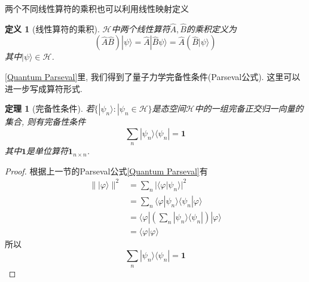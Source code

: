 \documentclass[a4paper,11pt]{book}
\newtheorem{definition}{\hspace{2em}定义}[section]
\newtheorem{theorem}{\hspace{2em}定理}[section]
\newtheorem{proof}{证明}[section]
\begin{document}
两个不同线性算符的乘积也可以利用线性映射定义\\
\begin{minipage}[b]{0.75\linewidth}
\begin{definition}[线性算符的乘积]
    $\mathcal{H}$中两个线性算符$\hat{A},\hat{B}$的乘积定义为
\begin{equation*}
  (\hat{A}\hat{B})|\psi\rangle=\hat{A}|\hat{B}\psi\rangle=\hat{A}(\hat{B}|\psi\rangle)
\end{equation*}
其中$|\psi\rangle\in\mathcal{H}$.
\end{definition}
\end{minipage}
\begin{minipage}[b]{0.25\linewidth}
\end{minipage}

\ref{Quantum Parseval}里, 我们得到了量子力学完备性条件(Parseval公式). 这里可以进一步写成算符形式.
\begin{theorem}[完备性条件]\label{Quantum Completed condition}
  若$\{|\psi_n\rangle:|\psi_n\in\mathcal{H}\}$是态空间$\mathcal{H}$中的一组完备正交归一向量的集合, 则有完备性条件
\begin{equation*}
  \sum_{n}|\psi_n\rangle\langle\psi_n|=\mathbf{1}
\end{equation*}
其中$\mathbf{1}$是单位算符$\mathbf{1}_{n\times n}$.
\end{theorem}
\begin{proof}
  根据上一节的Parseval公式\ref{Quantum Parseval}有
\begin{equation*}
  \begin{split}
     \||\varphi\rangle\|^2&=\sum_{n}|\langle\varphi|\psi_n\rangle|^2 \\
       & =\sum_{n}\langle\varphi|\psi_n\rangle\langle\psi_n|\varphi\rangle \\
       & =\langle\varphi|\left(\sum_{n}|\psi_n\rangle\langle\psi_n|\right)|\varphi\rangle \\
       & =\langle\varphi|\varphi\rangle
  \end{split}
\end{equation*}
所以
\begin{equation*}
  \sum_{n}|\psi_n\rangle\langle\psi_n|=\mathbf{1}
\end{equation*}
\end{proof}
\end{document}
